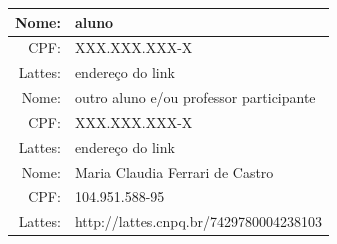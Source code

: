 \documentclass[rascunho,xindy]{Classe-Latex-FEI/fei}
\begin{document}
\begin{tabular}{| r || l |}
    \hline
        Nome:   & aluno \\ \hline
        CPF:    & XXX.XXX.XXX-X \\ \hline
        Lattes: & endereço do link \\ \hline
    \hline
        Nome:   & outro aluno e/ou professor participante \\ \hline
        CPF:    & XXX.XXX.XXX-X \\ \hline
        Lattes: & endereço do link \\ \hline
    \hline
        Nome:   & Maria Claudia Ferrari de Castro \\ \hline
        CPF:    & 104.951.588-95 \\ \hline
        Lattes: & http://lattes.cnpq.br/7429780004238103 \\
    \hline
\end{tabular}


\end{document}
